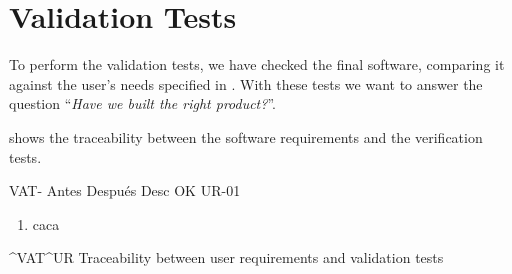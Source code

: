 \begin{landscape}
  \begin{table}
      {}
  \end{table}
\end{landscape}



\FloatBarrier


\section{Validation Tests}\label{sec:validation}
To perform the validation tests, we have checked the final software, comparing it against the user's needs specified in . With these tests we want to answer the question ``\textit{Have we built the right product?}''.

 shows the traceability between the software requirements and the verification tests.

\setcounter{i}{1}

\begin{testCase}{VAT-}
  {Antes}  %
  {Después}  %
  {Desc}  %
  {OK}  %
  {UR-01}  %
  \begin{enumerate}[leftmargin=*, topsep=0pt, noitemsep]  %
    \item caca
  \end{enumerate}
\end{testCase}

\FloatBarrier

  {^VAT}{^UR}
  {Traceability between user requirements and validation tests}
